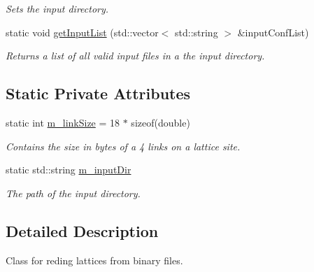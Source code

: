 \begin{DoxyCompactItemize}
\begin{DoxyCompactList}\small\item\em Sets the input directory. \end{DoxyCompactList}\item 
static void \hyperlink{classLatticeIO_1_1InputConf_a16b06fe98129e3c1e80879fa9cad43a9}{get\+Input\+List} (std\+::vector$<$ std\+::string $>$ \&input\+Conf\+List)\hypertarget{classLatticeIO_1_1InputConf_a16b06fe98129e3c1e80879fa9cad43a9}{}\label{classLatticeIO_1_1InputConf_a16b06fe98129e3c1e80879fa9cad43a9}

\begin{DoxyCompactList}\small\item\em Returns a list of all valid input files in a the input directory. \end{DoxyCompactList}\end{DoxyCompactItemize}
\subsection*{Static Private Attributes}
\begin{DoxyCompactItemize}
\item 
static int \hyperlink{classLatticeIO_1_1InputConf_a1f6a72c39487a0b44cacd27b15a0df0d}{m\+\_\+link\+Size} = 18 $\ast$ sizeof(double)\hypertarget{classLatticeIO_1_1InputConf_a1f6a72c39487a0b44cacd27b15a0df0d}{}\label{classLatticeIO_1_1InputConf_a1f6a72c39487a0b44cacd27b15a0df0d}

\begin{DoxyCompactList}\small\item\em Contains the size in bytes of a 4 links on a lattice site. \end{DoxyCompactList}\item 
static std\+::string \hyperlink{classLatticeIO_1_1InputConf_ac2dcaeda7ddb006f1446b53f5ec6f168}{m\+\_\+input\+Dir}\hypertarget{classLatticeIO_1_1InputConf_ac2dcaeda7ddb006f1446b53f5ec6f168}{}\label{classLatticeIO_1_1InputConf_ac2dcaeda7ddb006f1446b53f5ec6f168}

\begin{DoxyCompactList}\small\item\em The path of the input directory. \end{DoxyCompactList}\end{DoxyCompactItemize}


\subsection{Detailed Description}
Class for reding lattices from binary files. 

